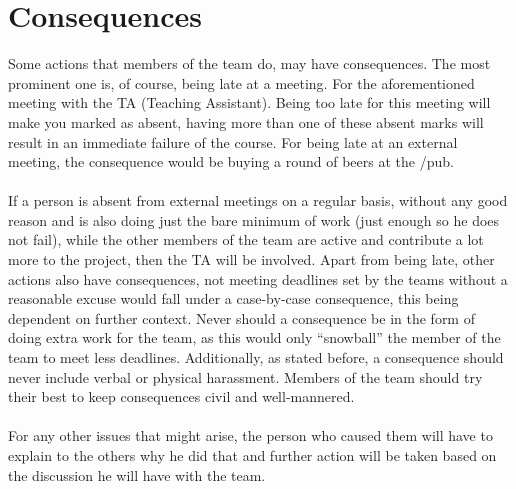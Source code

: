 \section{Consequences}
Some actions that members of the team do, may have consequences. The most prominent one is, of course, being late at a meeting. For the aforementioned meeting with the TA (Teaching Assistant). Being too late for this meeting will make you marked as absent, having more than one of these absent marks will result in an immediate failure of the course. For being late at an external meeting, the consequence would be buying a round of beers at the /pub.
\\\\
If a person is absent from external meetings on a regular basis, without any good reason and is also doing just the bare minimum of work (just enough so he does not fail), while the other members of the team are active and contribute a lot more to the project, then the TA will be involved. 
Apart from being late, other actions also have consequences, not meeting deadlines set by the teams without a reasonable excuse would fall under a case-by-case consequence, this being dependent on further context. Never should a consequence be in the form of doing extra work for the team, as this would only “snowball” the member of the team to meet less deadlines. Additionally, as stated before, a consequence should never include verbal or physical harassment. Members of the team should try their best to keep consequences civil and well-mannered.
\\\\
For any other issues that might arise, the person who caused them will have to explain to the others why he did that and further action will be taken based on the discussion he will have with the team.
